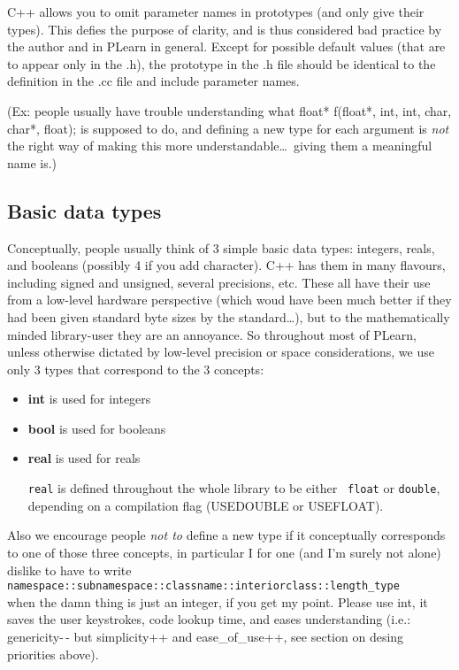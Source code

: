 \documentclass[11pt]{book}
\begin{document}
 C++ allows you to omit parameter names in prototypes (and only
give their types). This defies the purpose of clarity, and is thus
considered bad practice by the author and in PLearn in general. Except
for possible default values (that are to appear only in the .h),
the prototype in the .h file should be identical to the definition
in the .cc file and include parameter names.

 (Ex: people usually have trouble understanding what float* f(float*,
int, int, char, char*, float); is supposed to do, and defining a new
type for each argument is \emph{not} the right way of making this
more understandable\ldots\ giving them a meaningful name is.)

\subsection*{Basic data types}
 Conceptually, people usually think of 3 simple basic data types:
integers, reals, and booleans (possibly 4 if you add character). C++
has them in many flavours, including signed and unsigned, several
precisions, etc. These all have their use from a low-level hardware
perspective (which woud have been much better if they had been given
standard byte sizes by the standard\ldots), but to the mathematically
minded library-user they are an annoyance. So throughout most of
PLearn, unless otherwise dictated by low-level precision or space
considerations, we use only 3 types that correspond to the 3 concepts:

\begin{itemize}
\item \textbf{int} is used for integers
\item \textbf{bool} is used for booleans
\item \textbf{real} is used for reals

{\tt real} is defined throughout the whole library to be either {\tt
float} or {\tt double}, depending on a compilation flag (USEDOUBLE
or USEFLOAT).
\end{itemize}

 Also we encourage people \emph{not to} define a new type if it
conceptually corresponds to one of those three concepts, in particular
I for one (and I'm surely not alone) dislike to have to write\\
\texttt{namespace::subnamespace::classname::interiorclass::length\_type}\\
when the damn thing is just an integer, if you get my point. Please
use int, it saves the user keystrokes, code lookup time, and
eases understanding (i.e.: genericity-\,- but simplicity++ and
ease\_of\_use++, see section on desing priorities above).
\end{document}
